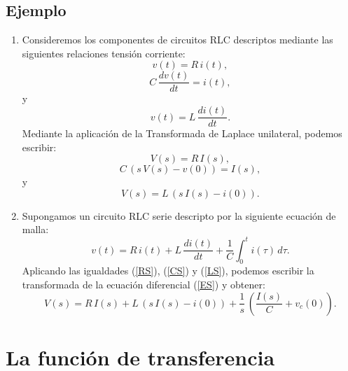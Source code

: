\subsection{Ejemplo}

\begin{enumerate}
	\item Consideremos los componentes de circuitos RLC descriptos mediante las siguientes relaciones tensi\'{o}n corriente:
	\begin{equation}
		v(t) = R \, i(t),
	\end{equation}
	\begin{equation}
		C \, \frac{dv(t)}{dt} = i(t),
	\end{equation}
	y
	\begin{equation}
		v(t) = L \, \frac{d i(t)}{dt}.
	\end{equation}
	Mediante la aplicaci\'{o}n de la Transformada de Laplace unilateral, podemos escribir:
	\begin{equation}
		V(s) = R \, I(s), \label{RS}
	\end{equation}
	\begin{equation}
		C \, \left( s \, V(s) - v(0) \right) = I(s), \label{CS}
	\end{equation}
	y
	\begin{equation}
		V(s) = L \, \left(s \, I(s) - i(0)\right).
		\label{LS}
	\end{equation}
	
	\item Supongamos un circuito RLC serie descripto por la siguiente ecuaci\'{o}n de malla:
	\begin{equation}
		v(t) = R \, i(t) + L \, \frac{di(t)}{dt} + \frac{1}{C} \int_{0}^{t} i(\tau) \, d\tau.
		\label{ES}
	\end{equation}
	Aplicando las igualdades (\ref{RS}), (\ref{CS}) y (\ref{LS}), podemos escribir la transformada de la ecuaci\'{o}n diferencial (\ref{ES}) y obtener:
	\begin{equation}
		V(s) = R \, I(s) + L \, \left(s \, I(s) - i(0)\right) + \frac{1}{s} \, \left(\frac{I(s)}{C} + v_{c}(0)\right).
	\end{equation}
\end{enumerate}

\section{La funci\'{o}n de transferencia}

